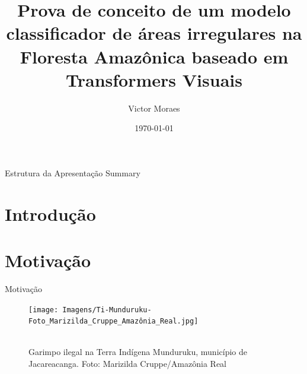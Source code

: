 \documentclass[8pt]{beamer}
\title{Prova de conceito de um modelo classificador de áreas irregulares na Floresta Amazônica baseado em Transformers Visuais}
\author{Victor Moraes}
\institute{UFMG}
\date{\today}
\begin{document}
\frame{\titlepage}

\begin{frame}{Estrutura da Apresentação}
    \tableofcontents
    {Summary}

\end{frame}

\section{Introdução} 



\section{Motivação} 
\begin{frame}{Motivação}  

    \begin{figure}[!h]
    \centering
    \texttt{[image: Imagens/Ti-Munduruku-Foto\_Marizilda\_Cruppe\_Amazônia\_Real.jpg]}
    \caption[width=0.2\columnwidth]{\\\small Garimpo ilegal na Terra Indígena Munduruku, município de Jacareacanga. Foto: Marizilda Cruppe/Amazônia Real}
    \label{fig:garimpo}
    \end{figure}


\end{frame}
\end{document}
